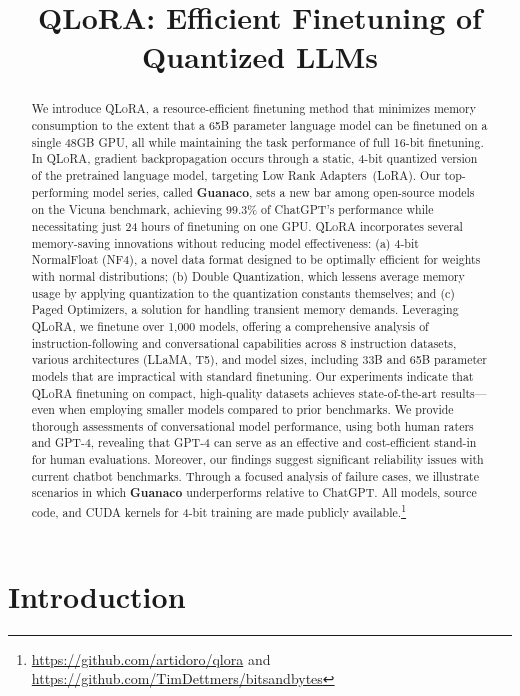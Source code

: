 \title{QLoRA: Efficient Finetuning of Quantized LLMs}

\begin{abstract}
We introduce \textsc{QLoRA}, a resource-efficient finetuning method that minimizes memory consumption to the extent that a 65B parameter language model can be finetuned on a single 48GB GPU, all while maintaining the task performance of full 16-bit finetuning. In \textsc{QLoRA}, gradient backpropagation occurs through a static, 4-bit quantized version of the pretrained language model, targeting Low Rank Adapters~(LoRA). Our top-performing model series, called \textbf{Guanaco}, sets a new bar among open-source models on the Vicuna benchmark, achieving 99.3\% of ChatGPT's performance while necessitating just 24 hours of finetuning on one GPU. \textsc{QLoRA} incorporates several memory-saving innovations without reducing model effectiveness: (a) 4-bit NormalFloat (NF4), a novel data format designed to be optimally efficient for weights with normal distributions; (b) Double Quantization, which lessens average memory usage by applying quantization to the quantization constants themselves; and (c) Paged Optimizers, a solution for handling transient memory demands. Leveraging \textsc{QLoRA}, we finetune over 1,000 models, offering a comprehensive analysis of instruction-following and conversational capabilities across 8 instruction datasets, various architectures (LLaMA, T5), and model sizes, including 33B and 65B parameter models that are impractical with standard finetuning. Our experiments indicate that \textsc{QLoRA} finetuning on compact, high-quality datasets achieves state-of-the-art results—even when employing smaller models compared to prior benchmarks. We provide thorough assessments of conversational model performance, using both human raters and GPT-4, revealing that GPT-4 can serve as an effective and cost-efficient stand-in for human evaluations. Moreover, our findings suggest significant reliability issues with current chatbot benchmarks. Through a focused analysis of failure cases, we illustrate scenarios in which \textbf{Guanaco} underperforms relative to ChatGPT. All models, source code, and CUDA kernels for 4-bit training are made publicly available.\footnote{\url{https://github.com/artidoro/qlora} and \url{https://github.com/TimDettmers/bitsandbytes}}
\end{abstract}

\section{Introduction}

